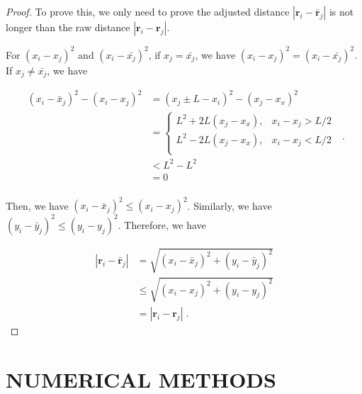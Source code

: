 \documentclass[%
 aip,
 amsmath,amssymb,
 reprint,%
]{revtex4-1}
\begin{document}
\begin{proof}
    To prove this, we only need to prove the adjusted distance $\left| \mathbf{r}_i-\bar{\mathbf{r}}_j \right|$ is not longer than the raw distance $\left| \mathbf{r}_i-\mathbf{r}_j \right|$.
    
    For $\left( x_i-x_j \right) ^2$ and $\left( x_i-\bar{x_j} \right) ^2$, if $x_j=\bar{x_j}$, we have $\left( x_i-x_j \right) ^2=\left( x_i-\bar{x_j} \right) ^2$. If $x_j\ne \bar{x_j}$, we have

    \begin{equation}
        \begin{aligned}
            \left( x_i-\bar{x}_j \right) ^2-\left( x_i-x_j \right) ^2&=\left( x_j\pm L-x_i \right) ^2-\left( x_j-x_x \right) ^2\\
            &=\begin{cases}
            L^2+2L\left( x_j-x_x \right) ,&		x_i-x_j>L/2\\
            L^2-2L\left( x_j-x_x \right) ,&		x_i-x_j<L/2\\
        \end{cases}\\
            &<L^2-L^2\\
            &=0\\
        \end{aligned}\;.
    \end{equation}

    Then, we have $\left( x_i-\bar{x}_j \right) ^2\leqslant \left( x_i-x_j \right) ^2$. Similarly, we have $\left( y_i-\bar{y}_j \right) ^2\leqslant \left( y_i-y_j \right) ^2$. Therefore, we have 

    \begin{equation}
        \begin{aligned}
            \left| \mathbf{r}_i-\bar{\mathbf{r}}_j \right|&=\sqrt{\left( x_i-\bar{x}_j \right) ^2+\left( y_i-\bar{y}_j \right) ^2}\\
            &\leqslant \sqrt{\left( x_i-x_j \right) ^2+\left( y_i-y_j \right) ^2}\\
            &=\left| \mathbf{r}_i-\mathbf{r}_j \right|\;.
        \end{aligned}
    \end{equation}

\end{proof}


\section{\label{sec:numerics} NUMERICAL METHODS}
\end{document}
